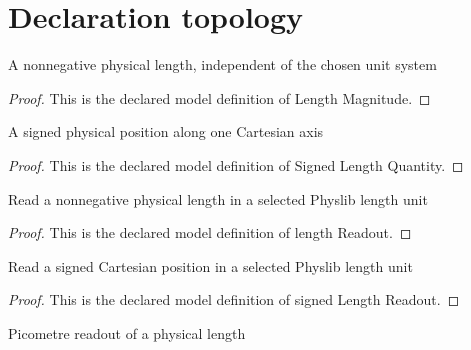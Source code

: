 \section{Declaration topology}
\begin{definition}
  \label{def:physics:phyx-mini-0583:phyxminiproblems-problemphyxmini0583-lengthmagnitude}
  A nonnegative physical length, independent of the chosen unit system
\end{definition}
\begin{proof}
  This is the declared model definition of Length Magnitude.
\end{proof}
\begin{definition}
  \label{def:physics:phyx-mini-0583:phyxminiproblems-problemphyxmini0583-signedlengthquantity}
  A signed physical position along one Cartesian axis
\end{definition}
\begin{proof}
  This is the declared model definition of Signed Length Quantity.
\end{proof}
\begin{definition}
  \label{def:physics:phyx-mini-0583:phyxminiproblems-problemphyxmini0583-lengthreadout}
  Read a nonnegative physical length in a selected Physlib length unit
\end{definition}
\begin{proof}
  This is the declared model definition of length Readout.
\end{proof}
\begin{definition}
  \label{def:physics:phyx-mini-0583:phyxminiproblems-problemphyxmini0583-signedlengthreadout}
  Read a signed Cartesian position in a selected Physlib length unit
\end{definition}
\begin{proof}
  This is the declared model definition of signed Length Readout.
\end{proof}
\begin{definition}
  \label{def:physics:phyx-mini-0583:phyxminiproblems-problemphyxmini0583-lengthinpicometers}
  Picometre readout of a physical length
\end{definition}
